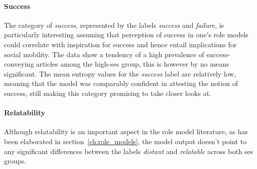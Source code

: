 \paragraph{Success}
The category of \textit{success}, represented by the labels \textit{success} and \textit{failure}, is particularly interesting assuming that perception of success in one's role models could correlate with inspiration for success and hence entail implications for social mobility. The data show a tendency of a high prevalence of success-conveying articles among the high-\gls{ses} group, this is however by no means significant. The mean entropy values for the \textit{success} label are relatively low, meaning that the model was comparably confident in attesting the notion of success, still making this category promising to take closer looks at.

\paragraph{Relatability}
Although relatability is an important aspect in the role model literature, as has been elaborated in section~\ref{ch:role_models}, the model output doesn't point to any significant differences between the labels \textit{distant} and \textit{relatable} across both \gls{ses} groups.

